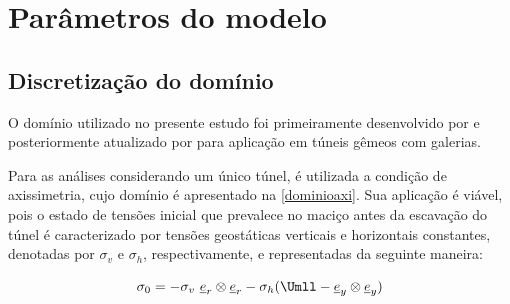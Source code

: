 %
%
%
%
\chapter{Parâmetros do modelo}


\section{Discretização do domínio}

O domínio utilizado no presente estudo foi primeiramente desenvolvido por  e posteriormente atualizado por  para aplicação em túneis gêmeos com galerias. %

Para as análises considerando um único túnel, é utilizada a condição de axissimetria, cujo domínio é apresentado na \autoref{dominioaxi}. Sua aplicação é viável, pois o estado de tensões inicial que prevalece no maciço antes da escavação do túnel é caracterizado por tensões geostáticas verticais e horizontais constantes, denotadas por $\sigma_v$ e $\sigma_h$, respectivamente, e representadas da seguinte maneira:

\begin{equation}
	\sigma_0 = -\sigma_v ~ \underline{e}_r \otimes \underline{e}_r - \sigma_h (\Umll - \underline{e}_y \otimes \underline{e}_y)
\end{equation}


